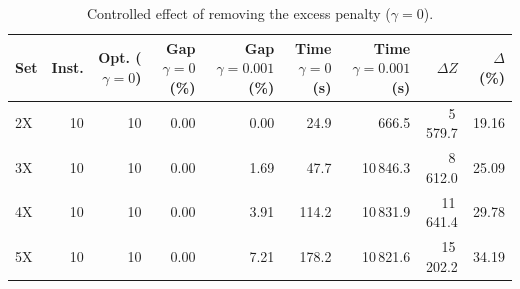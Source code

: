 \begin{table}[t]
\centering
\footnotesize
\caption{Controlled effect of removing the excess penalty ($\gamma=0$).}
\label{tab:gamma}
\begin{tabular}{lrrrrrrrr}
\toprule
Set & Inst. & Opt. ($\gamma=0$) & Gap $\gamma=0$ (\%) & Gap $\gamma=0.001$ (\%) & Time $\gamma=0$ (s) & Time $\gamma=0.001$ (s) & $\Delta Z$ & $\Delta$ (\%) \\
\midrule
2X & 10 & 10 & 0.00 & 0.00 & 24.9 & 666.5 & 5\,579.7 & 19.16 \\
3X & 10 & 10 & 0.00 & 1.69 & 47.7 & 10\,846.3 & 8\,612.0 & 25.09 \\
4X & 10 & 10 & 0.00 & 3.91 & 114.2 & 10\,831.9 & 11\,641.4 & 29.78 \\
5X & 10 & 10 & 0.00 & 7.21 & 178.2 & 10\,821.6 & 15\,202.2 & 34.19 \\
\bottomrule
\end{tabular}
\end{table}
